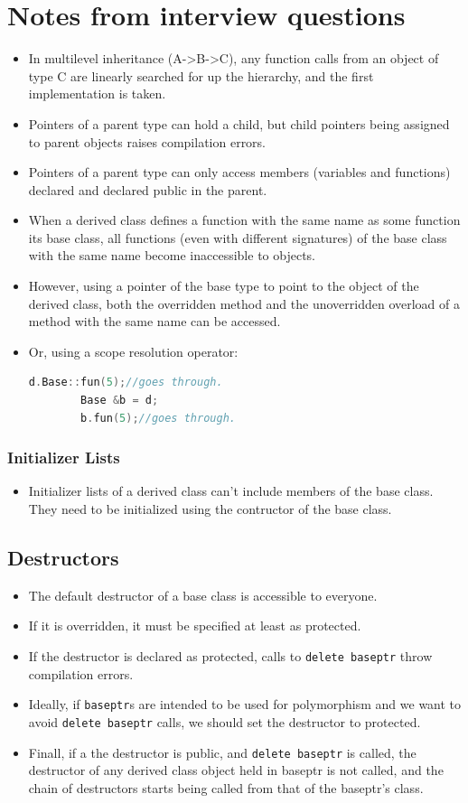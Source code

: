 \documentclass{report}
\begin{document}
\section{Notes from interview questions}
\begin{itemize}
    \item In multilevel inheritance (A->B->C), any function calls from an object of type C are linearly searched for up the hierarchy, and the first implementation is taken.
    \item Pointers of a parent type can hold a child, but child pointers being assigned to parent objects raises compilation errors.
    \item Pointers of a parent type can only access members (variables and functions) declared and declared public in the parent.
    \item When a derived class defines a function with the same name as some function its base class, all functions (even with different signatures) of the base class with the same name become inaccessible to objects.
    \item However, using a pointer of the base type to point to the object of the derived class, both the overridden method and the unoverridden overload of a method with the same name can be accessed.
    \item Or, using a scope resolution operator:
    \begin{lstlisting}[language=C++]
        d.Base::fun(5);//goes through.
        Base &b = d;
        b.fun(5);//goes through.
    \end{lstlisting}
\end{itemize}
\subsubsection{Initializer Lists}
\begin{itemize}
\item Initializer lists of a derived class can't
include members of the base class. They need to be initialized using the contructor of the base class.
\end{itemize}
\subsection{Destructors}
\begin{itemize}
\item The default destructor of a base class is accessible to everyone.
\item If it is overridden, it must be specified at least as protected.
\item If the destructor is declared as protected, calls to \texttt{delete baseptr}
throw compilation errors.
\item Ideally, if \texttt{baseptr}s are intended to be used for polymorphism and 
we want to avoid \texttt{delete baseptr} calls, we should set the destructor to protected.
\item Finall, if a the destructor is public, and \texttt{delete baseptr} is called, the 
destructor of any derived class object held in baseptr is not called, and the chain of destructors
starts being called from that of the baseptr's class.
\end{itemize}
\end{document}
